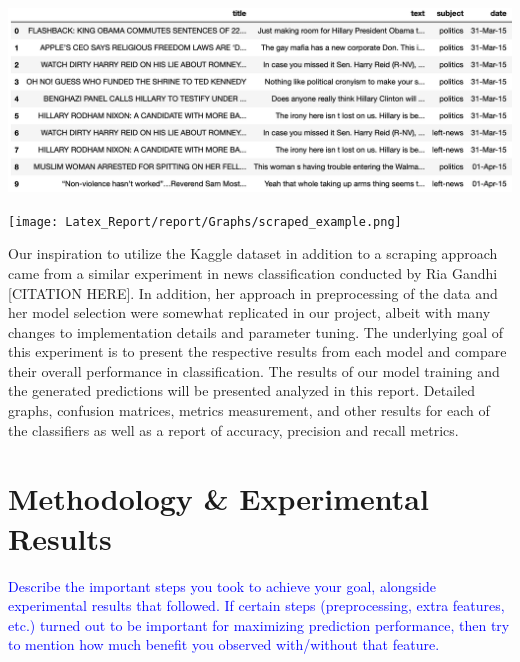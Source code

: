 \documentclass[10pt,twocolumn,letterpaper]{article}
\begin{document}
\begin{center}
\includegraphics[width=\linewidth]{Latex_Report/report/Graphs/dt_example.png}
\end{center}

\begin{center}
\texttt{[image: Latex\_Report/report/Graphs/scraped\_example.png]}
\end{center}

Our inspiration to utilize the Kaggle dataset in addition to a scraping approach came from a similar experiment in news classification conducted by Ria Gandhi [CITATION HERE]. In addition, her approach in preprocessing of the data and her model selection were somewhat replicated in our project, albeit with many changes to implementation details and parameter tuning. The underlying goal of this experiment is to present the respective results from each model and compare their overall performance in classification. The results of our model training and the generated predictions will be presented analyzed in this report. Detailed graphs, confusion matrices, metrics measurement, and other results  for each of the classifiers as well as a report of accuracy, precision and recall metrics. 


\section{Methodology \& Experimental Results}

\textcolor{blue}{Describe the important steps you took to achieve your goal, alongside experimental results that followed. If certain steps (preprocessing, extra features, etc.) turned out to be important for maximizing prediction performance, then try to mention how much benefit you observed with/without that feature.}
\end{document}
